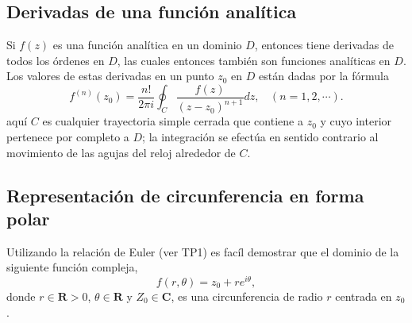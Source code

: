 \documentclass[10pt,a4paper]{article}
\begin{document}
\subsection*{Derivadas de una funci\'on anal\'itica}
Si $f(z)$ es una funci\'on anal\'itica en un dominio $D$, entonces tiene derivadas 
de todos los \'ordenes en $D$, las cuales entonces tambi\'en son funciones 
anal\'iticas en $D$. Los valores de estas derivadas en un punto $z_0$ en $D$ est\'an
dadas por la f\'ormula
\begin{equation}\label{eq:derivadafanalitica}
f^{(n)}(z_0)=\dfrac{n!}{2\pi i}\oint_C\dfrac{f(z)}{(z-z_0)^{n+1}}dz, ~~~~ (n=1,2,\cdots).
\end{equation}
aqu\'i $C$ es cualquier trayectoria simple cerrada que contiene a $z_0$ y cuyo interior pertenece por completo a $D$; la integraci\'on se efect\'ua en sentido contrario al movimiento de las agujas del reloj alrededor de $C$.


\subsection*{Representaci\'on de circunferencia en forma polar}
	Utilizando la relaci\'on de Euler (ver TP1) es fac\'il  demostrar que el 
	dominio de la siguiente funci\'on compleja,
\begin{equation}
f(r,\theta)=z_0+re^{i\theta},
\label{eq:ht2}
\end{equation}
donde $r\in \mathbf{R}>0$, $\theta \in \mathbf{R}$ y $Z_0 \in \mathbf{C}$, es 
una circunferencia de radio $r$ centrada en $z_0$.



\end{document}
